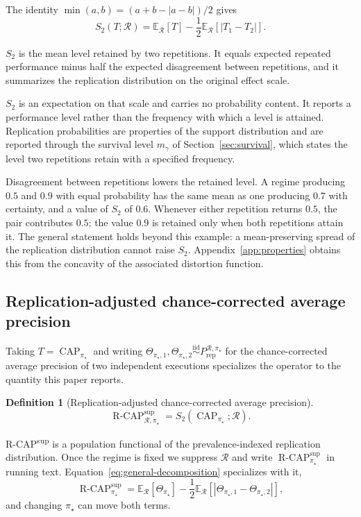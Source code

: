 \documentclass[11pt]{article}
\newcommand{\CAP}{\operatorname{CAP}}
\newcommand{\Regime}{\mathcal{R}}
\newcommand{\E}{\mathbb{E}}
\newcommand{\iid}{\mathrel{\overset{\mathrm{iid}}{\sim}}}
\newcommand{\RCAPfull}{\operatorname{R\text{-}CAP}^{\mathrm{sup}}_{\Regime,\pi_\star}}
\newcommand{\RCAP}{\operatorname{R\text{-}CAP}^{\mathrm{sup}}_{\pi_\star}}
\newcommand{\PRep}{P_{\mathrm{rep}}^{\Regime,\pi_\star}}
\newtheorem{definition}{Definition}
\theoremstyle{remark}
\begin{document}
The identity $\min(a,b)=(a+b-|a-b|)/2$ gives
\begin{equation}
S_2(T;\Regime)
=
\E_{\Regime}[T]
-
\frac12\E_{\Regime}[|T_1-T_2|].
\label{eq:general-decomposition}
\end{equation}

$S_2$ is the mean level retained by two repetitions. It equals expected repeated performance minus half the expected disagreement between repetitions, and it summarizes the replication distribution on the original effect scale.

$S_2$ is an expectation on that scale and carries no probability content. It reports a performance level rather than the frequency with which a level is attained. Replication probabilities are properties of the support distribution and are reported through the survival level $m_\gamma$ of Section~\ref{sec:survival}, which states the level two repetitions retain with a specified frequency.

Disagreement between repetitions lowers the retained level. A regime producing $0.5$ and $0.9$ with equal probability has the same mean as one producing $0.7$ with certainty, and a value of $S_2$ of $0.6$. Whenever either repetition returns $0.5$, the pair contributes $0.5$; the value $0.9$ is retained only when both repetitions attain it. The general statement holds beyond this example: a mean-preserving spread of the replication distribution cannot raise $S_2$. Appendix~\ref{app:properties} obtains this from the concavity of the associated distortion function.

\subsection{Replication-adjusted chance-corrected average precision}

Taking $T=\CAP_{\pi_\star}$ and writing $\Theta_{\pi_\star,1},\Theta_{\pi_\star,2}\iid\PRep$ for the chance-corrected average precision of two independent executions specializes the operator to the quantity this paper reports.

\begin{definition}[Replication-adjusted chance-corrected average precision]
\begin{equation}
\RCAPfull
=
S_2(\CAP_{\pi_\star};\Regime).
\label{eq:rcap}
\end{equation}
\end{definition}

R-CAP\textsuperscript{sup} is a population functional of the prevalence-indexed replication distribution. Once the regime is fixed we suppress $\Regime$ and write $\RCAP$ in running text. Equation~\eqref{eq:general-decomposition} specializes with it,
\begin{equation}
\RCAP
=
\E_{\Regime}[\Theta_{\pi_\star}]
-
\frac12
\E_{\Regime}
\left[
|\Theta_{\pi_\star,1}-\Theta_{\pi_\star,2}|
\right],
\label{eq:decomposition}
\end{equation}
and changing $\pi_\star$ can move both terms.
\end{document}
